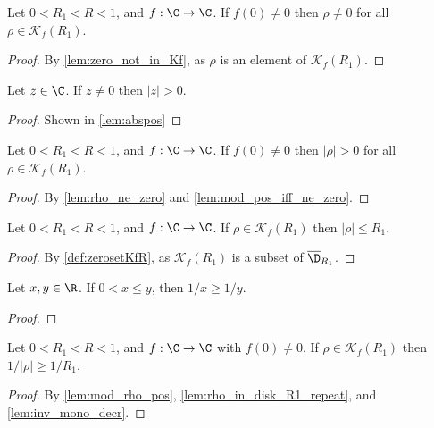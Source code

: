 \begin{lemma}\label{lem:rho_ne_zero} \leanok {}
Let $0<R_1<R<1$, and $f:\C\to\C$. If $f(0)\neq0$ then $\rho\neq0$ for all $\rho\in \mathcal K_f(R_1)$.
\end{lemma}
\begin{proof} \leanok
{}
By \cref{lem:zero_not_in_Kf}, as $\rho$ is an element of $\mathcal{K}_f(R_1)$.
\end{proof}

\begin{lemma}\label{lem:mod_pos_iff_ne_zero} \leanok {}
Let $z \in \C$. If $z \neq 0$ then $|z| > 0$.
\end{lemma}
\begin{proof} \leanok
{}
Shown in \cref{lem:abspos}
\end{proof}

\begin{lemma}\label{lem:mod_rho_pos}  \leanok
Let $0<R_1<R<1$, and $f:\C\to\C$. If $f(0)\neq0$ then $|\rho|>0$ for all $\rho\in \mathcal K_f(R_1)$.
\end{lemma}
\begin{proof} \leanok
{}
By \cref{lem:rho_ne_zero} and \cref{lem:mod_pos_iff_ne_zero}.
\end{proof}

\begin{lemma}\label{lem:rho_in_disk_R1_repeat}  \leanok
Let $0<R_1<R<1$, and $f:\C\to\C$. If $\rho\in \mathcal K_f(R_1)$ then $|\rho|\le R_1$.
\end{lemma}
\begin{proof} \leanok
{}
By \cref{def:zerosetKfR}, as $\mathcal{K}_f(R_1)$ is a subset of $\overline{\D}_{R_1}$.
\end{proof}

\begin{lemma}\label{lem:inv_mono_decr}  \leanok
Let $x, y \in \R$. If $0 < x \le y$, then $1/x \ge 1/y$.
\end{lemma}
\begin{proof} \leanok
\end{proof}

\begin{lemma}\label{lem:inv_mod_rho_ge_inv_R1}  \leanok
Let $0<R_1<R<1$, and $f:\C\to\C$ with $f(0)\neq0$. If $\rho\in \mathcal K_f(R_1)$ then $1/|\rho|\ge 1/R_1$.
\end{lemma}
\begin{proof} \leanok
{}
By \cref{lem:mod_rho_pos}, \cref{lem:rho_in_disk_R1_repeat}, and \cref{lem:inv_mono_decr}.
\end{proof}


